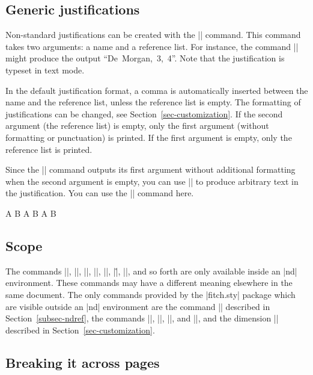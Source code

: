 \documentclass{ltxdoc}
\newcommand\NewIn[1]{\leavevmode
  \marginpar{\hfill\fbox{\fbox{New in #1}}\hspace*{1em}}\ignorespaces}
\begin{document}
\subsection{Generic justifications}

\DescribeMacro{\by}
Non-standard justifications can be created with the |\by|
command. This command takes two arguments: a name and a reference
list. For instance, the command || might
produce the output ``\mbox{De Morgan, 3, 4}''. Note that the justification
is typeset in text mode.

In the default justification format, a comma is automatically inserted
between the name and the reference list, unless the reference list is
empty. The formatting of justifications can be changed, see
Section~\ref{sec-customization}. If the second argument (the reference
list) is empty, only the first argument (without formatting or
punctuation) is printed. \NewIn{1.0} If the first argument is empty,
only the reference list is printed.

Since the |\by| command outputs its first argument without additional
formatting when the second argument is empty, you can use ||
to produce arbitrary text in the justification. You can use the
|\ndref| command here.
\begin{LTXexample}
\begin{fitchproof}
   {A \Rightarrow B} 
   {A} 
   {B}
   {A \wedge B} 
\end{fitchproof}
\end{LTXexample}

\subsection{Scope}

The commands |\hypo|, |\have|, |\open|, |\close|, |\by|, |\r|, |\ii|, and so
forth are only available inside an |nd| environment. These commands
may have a different meaning elsewhere in the same document. The only
commands provided by the |fitch.sty|  package which are visible
outside an |nd| environment are the command |\ndref| described in
Section~\ref{subsec-ndref}, the commands |\ndrules|, |\ndjustformat|,
|\ndrefformat|, and |\nddim|, and the dimension |\ndindent| described
in Section~\ref{sec-customization}.

\subsection{Breaking it across pages}\label{subsec-break}
\end{document}
